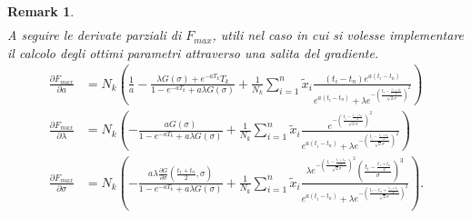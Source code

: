 \documentclass[10pt,a4paper]{report}
\newtheorem{remark}{Remark}
\begin{document}
\begin{remark}
\begin{align*}
\end{align*}
A seguire le derivate parziali di $F_{max}$, utili nel caso in cui si volesse implementare il calcolo degli ottimi parametri attraverso una salita del gradiente.
\begin{align*}
\frac{\partial F_{max}}{\partial a} &= N_k\left(\frac{1}{a}-\frac{\lambda G(\sigma)+e^{-a T_k}T_k}{1-e^{-aT_k}+a\lambda G(\sigma)}+\frac{1}{N_k}\sum_{i=1}^n\tilde{x}_i\frac{(t_i-t_n)e^{a(t_i-t_n)}}{e^{a(t_i-t_n)}+\lambda e^{-\left(\frac{t_i-\frac{t_1+t_n}{2}}{\sqrt{2}\sigma}\right)^2}}\right)\\
\frac{\partial F_{max}}{\partial \lambda} &= N_k\left(-\frac{a G(\sigma)}{1-e^{-aT_k}+a\lambda G(\sigma)}+\frac{1}{N_k}\sum_{i=1}^n\tilde{x}_i\frac{e^{-\left(\frac{t_i-\frac{t_1+t_n}{2}}{\sqrt{2}\sigma}\right)^2}}{e^{a(t_i-t_n)}+\lambda e^{-\left(\frac{t_i-\frac{t_1+t_n}{2}}{\sqrt{2}\sigma}\right)^2}}\right)\\
\frac{\partial F_{max}}{\partial\sigma} &= N_k\left(-\frac{a\lambda \frac{\partial G}{\partial\sigma}(\frac{t_1+t_n}{2},\sigma)}{1-e^{-aT_k}+a\lambda G(\sigma)}+\frac{1}{N_k}\sum_{i=1}^n\tilde{x}_i\frac{\lambda e^{-\left(\frac{t_i-\frac{t_1+t_n}{2}}{\sqrt{2}\sigma}\right)^2}\left(\frac{t_i-\frac{t_1+t_n}{2}}{\sigma}\right)^3}{e^{a(t_i-t_n)}+\lambda e^{-\left(\frac{t_i-t_n+\frac{t_1+t_n}{2}}{\sqrt{2}\sigma}\right)^2}}\right).
\end{align*}
\end{remark}
\end{document}
